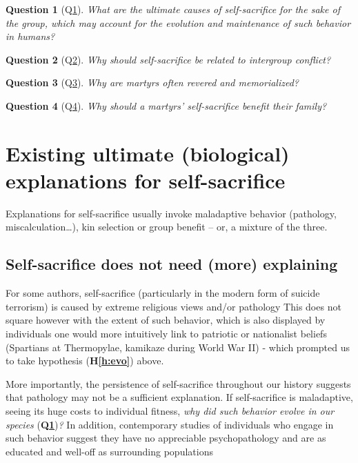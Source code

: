 \documentclass[a4paper,12pt]{report}
\newtheorem{quest}{Question}
\begin{document}
\begin{quest}[Q\ref{q:evo_ss}]
    \label{q:evo_ss}
    What are the ultimate causes of self-sacrifice for the sake of the group, 
    which may account for the evolution and maintenance of such behavior in humans?
\end{quest}

\begin{quest}[Q\ref{q:conflict}]
    \label{q:conflict}
    Why should self-sacrifice be related to intergroup conflict?
\end{quest}

\begin{quest}[Q\ref{q:revered}]
    \label{q:revered}
    Why are martyrs often revered and memorialized?
\end{quest}

\begin{quest}[Q\ref{q:spillover}]
    \label{q:spillover}
    Why should a martyrs' self-sacrifice benefit their family?
\end{quest}


\section{Existing ultimate (biological) explanations for self-sacrifice}
\label{s:xpla}
Explanations for self-sacrifice usually invoke maladaptive behavior
(pathology, miscalculation…), kin selection or group benefit – or, a mixture of the three.

\subsection{Self-sacrifice does not need (more) explaining}
\label{ss:error}
For some authors, self-sacrifice (particularly in the modern form of suicide terrorism)
is caused by extreme religious views and/or pathology %
This does not square however with the extent of such behavior, which is also displayed
by individuals one would more intuitively link to patriotic or nationalist beliefs
(Spartians at Thermopylae, kamikaze during World War II) - which prompted
us to take hypothesis (\textbf{H\ref{h:evo}}) above.

More importantly, the persistence of self-sacrifice throughout our history suggests
that pathology may not be a sufficient explanation.
If self-sacrifice is maladaptive,
seeing its huge costs to individual fitness, \emph{why did such behavior evolve in our species}
(\textbf{Q\ref{q:evo_ss}})\emph{?}
In addition, contemporary studies of individuals who engage in such behavior suggest
they have no appreciable psychopathology and are as educated and well-off as 
surrounding populations %
\end{document}
